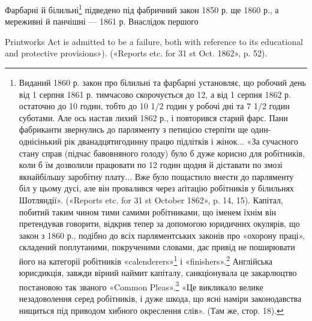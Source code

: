 Фарбарні й білильні\footnote{
Виданий 1860 р. закон про білильні та фарбарні установляє,
що робочий день від 1 серпня 1861 р. тимчасово скорочується до 12, а
від 1 серпня 1862 р. остаточно до 10 годин, тобто до 10 1/2 годин у робочі
дні та 7 1/2 годин суботами. Але ось настав лихий 1862 р., і повторився
старий фарс. Пани фабриканти звернулись до парляменту з петицією
стерпіти ще один-однісінький рік дванадцятигодинну працю підлітків
і жінок... «За сучасного стану справ (підчас бавовняного голоду) було б
дуже корисно для робітників, коли б їм дозволили працювати по 12 годин
щодня й діставати по змозі якнайбільшу заробітну плату... Вже було
пощастило внести до парляменту біл у цьому дусі, але він провалився
через аґітацію робітників у білильнях Шотляндії». («Reports etc. for
31 st October 1862», p. 14, 15). Капітал, побитий таким чином тими самими
робітниками, що іменем їхнім він претендував говорити, відкрив тепер
за допомогою юридичних окулярів, що закон з 1860 р., подібно до всіх
парляментських законів про «охорону праці», складений поплутаними,
покрученими словами, дає привід не поширювати його на категорії робітників
«calenderers»\footnote*{
— пресувальники сукна. Ред.
} і «finishers».\footnote*{
— апретери. Ред.
} Англійська юрисдикція, завжди
вірний наймит капіталу, санкціонувала це закарлюцтво постановою так
званого «Common Pleas».\footnote*{
— цивільний суд. Ред.
} «Це викликало велике незадоволення серед
робітників, і дуже шкода, що ясні наміри законодавства нищиться під
приводом хибного окреслення слів». (Там же, стор. 18).
} підведено під фабричний закон 1850 р.
ще 1860 р., а мереживні й панчішні — 1861 р. Внаслідок першого

Printworks Act is admitted to be a failure, both with reference to its educational
and protective provisions»). («Reports etc. for 31 st Oct. 1862», p. 52).
\parbreak{}  %
